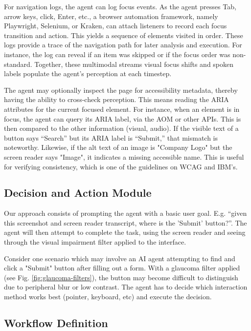 For navigation logs, the agent can log focus events. As the agent presses Tab, arrow keys, click, Enter, etc., a browser automation framework, namely Playwright\cite{playwright2025}, Selenium\cite{garcia2024selenium}, or Kraken\cite{ravelo2023kraken}, can attach listeners to record each focus transition and action. This yields a sequence of elements visited in order\cite{ravelo2023kraken}. 
These logs provide a trace of the navigation path for later analysis and execution. For instance, the log can reveal if an item was skipped or if the focus order was non-standard. Together, these multimodal streams visual focus shifts and spoken labels populate the agent's perception at each timestep. 

The agent may optionally inspect the page for accessibility metadata, thereby having the ability to cross-check perception. This means reading the ARIA attributes for the current focused element. For instance, when an element is in focus, the agent can query its ARIA label, via the \ac{AOM} or other APIs. This is then compared to the other information (visual, audio). If the visible text of a button says “Search” but its ARIA label is “Submit,” that mismatch is noteworthy. Likewise, if the alt text of an image is "Company Logo" but the screen reader says "Image", it indicates a missing accessible name. This is useful for verifying consistency, which is one of the guidelines on \ac{WCAG} and IBM's\cite{ibm2025accessibility}. 

\subsection{Decision and Action Module}

Our approach consists of prompting the agent with a basic user goal. E.g. “given this screenshot and screen reader transcript, where is the 'Submit' button?”. The agent will then attempt to complete the task, using the screen reader and seeing through the visual impairment filter applied to the interface.

Consider one scenario which may involve an \ac{AI} agent attempting to find and click a "Submit" button after filling out a form. With a glaucoma filter applied (see Fig. \ref{fig:glaucoma-filters}), the button may become difficult to distinguish due to peripheral blur or low contrast. The agent has to decide which interaction method works best (pointer, keyboard, etc) and execute the decision.

\subsection{Workflow Definition}

